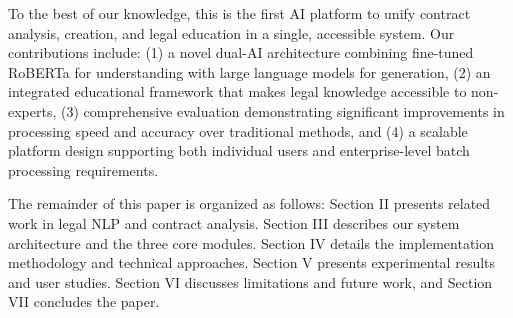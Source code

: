 To the best of our knowledge, this is the first AI platform to unify contract analysis, creation, and legal education in a single, accessible system. Our contributions include: (1) a novel dual-AI architecture combining fine-tuned RoBERTa for understanding with large language models for generation, (2) an integrated educational framework that makes legal knowledge accessible to non-experts, (3) comprehensive evaluation demonstrating significant improvements in processing speed and accuracy over traditional methods, and (4) a scalable platform design supporting both individual users and enterprise-level batch processing requirements.

The remainder of this paper is organized as follows: Section II presents related work in legal NLP and contract analysis. Section III describes our system architecture and the three core modules. Section IV details the implementation methodology and technical approaches. Section V presents experimental results and user studies. Section VI discusses limitations and future work, and Section VII concludes the paper.
